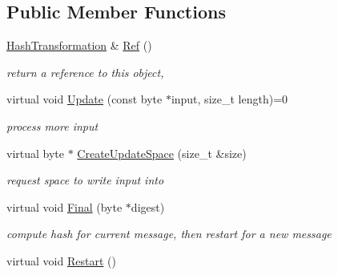 \subsection*{Public Member Functions}
\begin{DoxyCompactItemize}
\item 
\hyperlink{class_hash_transformation}{HashTransformation} \& \hyperlink{class_hash_transformation_a39b0a4c4cdc11fda358f9975b5e4137e}{Ref} ()
\begin{DoxyCompactList}\small\item\em return a reference to this object, \item\end{DoxyCompactList}\item 
\hypertarget{class_hash_transformation_aafabefaf445b65d3ba0d8e1c0294afe5}{
virtual void \hyperlink{class_hash_transformation_aafabefaf445b65d3ba0d8e1c0294afe5}{Update} (const byte $\ast$input, size\_\-t length)=0}
\label{class_hash_transformation_aafabefaf445b65d3ba0d8e1c0294afe5}

\begin{DoxyCompactList}\small\item\em process more input \item\end{DoxyCompactList}\item 
\hypertarget{class_hash_transformation_a9fc0b332ef36900ca6ea5d949e95aba1}{
virtual byte $\ast$ \hyperlink{class_hash_transformation_a9fc0b332ef36900ca6ea5d949e95aba1}{CreateUpdateSpace} (size\_\-t \&size)}
\label{class_hash_transformation_a9fc0b332ef36900ca6ea5d949e95aba1}

\begin{DoxyCompactList}\small\item\em request space to write input into \item\end{DoxyCompactList}\item 
virtual void \hyperlink{class_hash_transformation_aa0b8c7a110d8968268fd02ec32b9a8e8}{Final} (byte $\ast$digest)
\begin{DoxyCompactList}\small\item\em compute hash for current message, then restart for a new message \item\end{DoxyCompactList}\item 
\hypertarget{class_hash_transformation_a92752eebac10497211d7a065faba8725}{
virtual void \hyperlink{class_hash_transformation_a92752eebac10497211d7a065faba8725}{Restart} ()}
\label{class_hash_transformation_a92752eebac10497211d7a065faba8725}


\end{DoxyCompactItemize}
